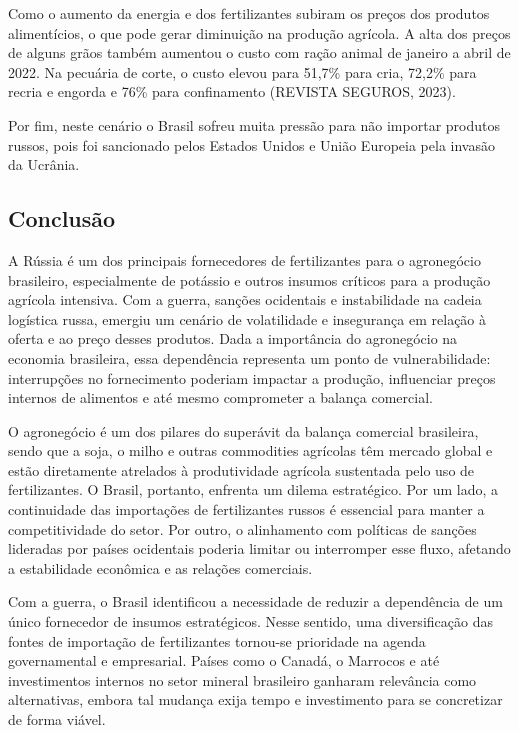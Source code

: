\documentclass[article,12pt,oneside,a4paper,english,brazil,sumario=tradicional]{abntex2}
\begin{document}
Como o aumento da energia e dos fertilizantes subiram os preços dos produtos alimentícios, o que pode gerar diminuição na produção agrícola. A alta dos preços de alguns grãos também aumentou o custo com ração animal de janeiro a abril de 2022. Na pecuária de corte, o custo elevou para 51,7\% para cria, 72,2\% para recria e engorda e 76\% para confinamento (REVISTA SEGUROS, 2023).

Por fim, neste cenário o Brasil sofreu muita pressão  para não importar produtos russos, pois foi sancionado pelos Estados Unidos e União Europeia pela invasão da Ucrânia.  

\subsection{Conclusão}
 
   A Rússia é um dos principais fornecedores de fertilizantes para o agronegócio brasileiro, especialmente de potássio e outros insumos críticos para a produção agrícola intensiva. Com a guerra, sanções ocidentais e instabilidade na cadeia logística russa, emergiu um cenário de volatilidade e insegurança em relação à oferta e ao preço desses produtos. Dada a importância do agronegócio na economia brasileira, essa dependência representa um ponto de vulnerabilidade: interrupções no fornecimento poderiam impactar a produção, influenciar preços internos de alimentos e até mesmo comprometer a balança comercial.

   O agronegócio é um dos pilares do superávit da balança comercial brasileira, sendo que a soja, o milho e outras commodities agrícolas têm mercado global e estão diretamente atrelados à produtividade agrícola sustentada pelo uso de fertilizantes. O Brasil, portanto, enfrenta um dilema estratégico. Por um lado, a continuidade das importações de fertilizantes russos é essencial para manter a competitividade do setor. Por outro, o alinhamento com políticas de sanções lideradas por países ocidentais poderia limitar ou interromper esse fluxo, afetando a estabilidade econômica e as relações comerciais.

   Com a guerra, o Brasil identificou a necessidade de reduzir a dependência de um único fornecedor de insumos estratégicos. Nesse sentido, uma diversificação das fontes de importação de fertilizantes tornou-se prioridade na agenda governamental e empresarial. Países como o Canadá, o Marrocos e até investimentos internos no setor mineral brasileiro ganharam relevância como alternativas, embora tal mudança exija tempo e investimento para se concretizar de forma viável.
\end{document}
